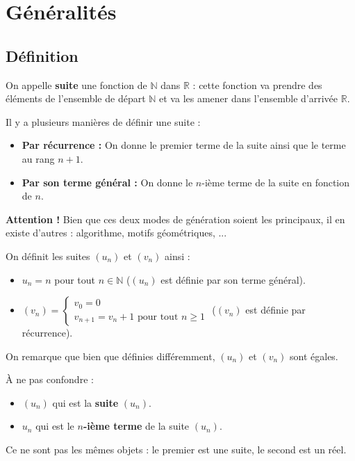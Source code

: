 


	
	\section{Généralités}
	
	\subsection{Définition}
	
	On appelle \textbf{suite} une fonction de $\mathbb{N}$ dans $\mathbb{R}$ : cette fonction va prendre des éléments de l'ensemble de départ $\mathbb{N}$ et va les amener dans l'ensemble d'arrivée $\mathbb{R}$.
	
	\begin{formula}[Définition]
		Il y a plusieurs manières de définir une suite :
		\begin{itemize}
			\item \textbf{Par récurrence :} On donne le premier terme de la suite ainsi que le terme au rang $n+1$.
			\item \textbf{Par son terme général :} On donne le $n$-ième terme de la suite en fonction de $n$.
		\end{itemize}
	\end{formula}
	
	\textbf{Attention !} Bien que ces deux modes de génération soient les principaux, il en existe d'autres : algorithme, motifs géométriques, ...
	
	\begin{tip}[Exemple]
		On définit les suites $(u_n)$ et $(v_n)$ ainsi :
		\begin{itemize}
			\item $u_n = n$ pour tout $n \in \mathbb{N}$ ($(u_n)$ est définie par son terme général).
			\item $(v_n) = \begin{cases} v_0 = 0 \\ v_{n+1} = v_n + 1 \text{ pour tout } n \geq 1 \end{cases}$ ($(v_n)$ est définie par récurrence).
		\end{itemize}
		On remarque que bien que définies différemment, $(u_n)$ et $(v_n)$ sont égales.
	\end{tip}
	
	\begin{tip}
		À ne pas confondre :
		\begin{itemize}
			\item $(u_n)$ qui est la \textbf{suite} $(u_n)$.
			\item $u_n$ qui est le \textbf{$n$-ième terme} de la suite $(u_n)$.
		\end{itemize}
		Ce ne sont pas les mêmes objets : le premier est une suite, le second est un réel.
	\end{tip}
	
